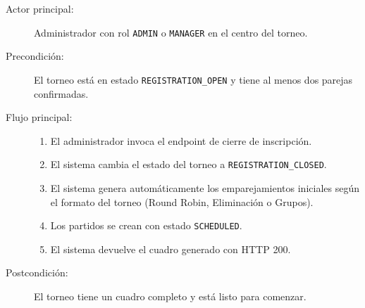 \begin{description}
  \item[Actor principal:]\leavevmode Administrador con rol \texttt{ADMIN} o \texttt{MANAGER}
    en el centro del torneo.
  \item[Precondición:]\leavevmode El torneo está en estado \texttt{REGISTRATION\_OPEN} y
    tiene al menos dos parejas confirmadas.
  \item[Flujo principal:]\leavevmode
    \begin{enumerate}
      \item El administrador invoca el endpoint de cierre de inscripción.
      \item El sistema cambia el estado del torneo a
        \texttt{REGISTRATION\_CLOSED}.
      \item El sistema genera automáticamente los emparejamientos iniciales
        según el formato del torneo (Round Robin, Eliminación o Grupos).
      \item Los partidos se crean con estado \texttt{SCHEDULED}.
      \item El sistema devuelve el cuadro generado con HTTP 200.
    \end{enumerate}
  \item[Postcondición:]\leavevmode El torneo tiene un cuadro completo y está listo para
    comenzar.
\end{description}
